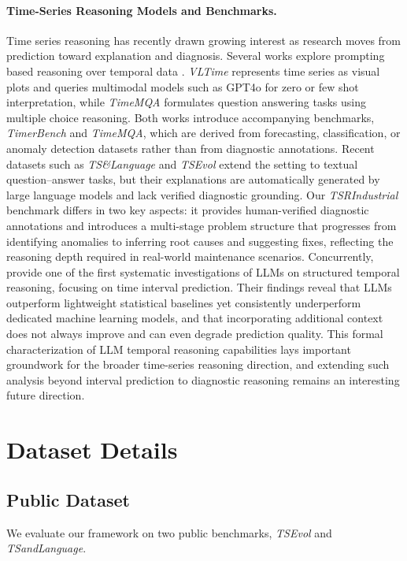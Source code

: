 \documentclass[twoside]{article}
\begin{document}
\paragraph{Time-Series Reasoning Models and Benchmarks.}
Time series reasoning has recently drawn growing interest as research moves from prediction toward explanation and diagnosis. Several works explore prompting based reasoning over temporal data \citep{jiang2025explainable,liu2025evaluating,merrill2024language}. \textit{VLTime} \citep{liu2025picture} represents time series as visual plots and queries multimodal models such as GPT4o for zero or few shot interpretation, while \textit{TimeMQA} \citep{kong2025time} formulates question answering tasks using multiple choice reasoning. Both works introduce accompanying benchmarks, \textit{TimerBench} and \textit{TimeMQA}, which are derived from forecasting, classification, or anomaly detection datasets rather than from diagnostic annotations. 
Recent datasets such as \textit{TS\&Language} \citep{merrill2024language} and \textit{TSEvol} \citep{xie2024chatts} extend the setting to textual question–answer tasks, but their explanations are automatically generated by large language models and lack verified diagnostic grounding.
Our \textit{TSRIndustrial} benchmark differs in two key aspects: it provides human-verified diagnostic annotations and introduces a multi-stage problem structure that progresses from identifying anomalies to inferring root causes and suggesting fixes, reflecting the reasoning depth required in real-world maintenance scenarios.
Concurrently, \citet{cao2026more} provide one of the first systematic investigations of LLMs on structured temporal reasoning, focusing on time interval prediction. Their findings reveal that LLMs outperform lightweight statistical baselines yet consistently underperform dedicated machine learning models, and that incorporating additional context does not always improve and can even degrade prediction quality. This formal characterization of LLM temporal reasoning capabilities lays important groundwork for the broader time-series reasoning direction, and extending such analysis beyond interval prediction to diagnostic reasoning remains an interesting future direction.

\section{Dataset Details}
\label{app:dataset}
\subsection{Public Dataset}
We evaluate our framework on two public benchmarks, \textit{TSEvol} and \textit{TSandLanguage}.
\end{document}
